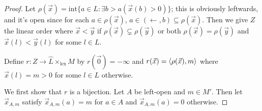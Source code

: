 \documentclass[11pt]{article}
\renewcommand{\int}{\textrm{int}}
\newcommand{\lexTimes}{\times_{\textrm{lex}}}
\newcommand{\vect}{\vec}
\begin{document}
  \begin{proof}
    Let \(\rho(\vect x)=\int\{a\in L:\exists b> a(\vect x(b)>0)\}\);
    this is obviously leftwards, and it's open since for each
    \(a\in\rho(\vect x)\), \(a\in(\leftarrow,b)\subseteq\rho(\vect x)\).
    Then we give \(Z\) the linear order where \(\vect x<\vect y\) if
    \(\rho(\vect x)\subsetneq\rho(\vect y)\) or both
    \(\rho(\vect x)=\rho(\vect y)\)
    and \(\vect x(l)<\vect y(l)\) for some \(l\in L\).

    Define \(r:Z\to \hat L\lexTimes M\)
    by \(r(\vect 0)=-\infty\) and \(r(\vect x)=\<\rho(\vect x),m\>\) where
    \(\vect x(l)=m>0\) for some \(l\in L\) otherwise.

    We first show that \(r\) is a bijection. Let \(A\) be left-open
    and \(m\in M'\). Then let \(\vect x_{A,m}\) satisfy \(\vect x_{A,m}(a)=m\)
    for \(a\in A\) and \(\vect x_{A,m}(a)=0\) otherwise.
  \end{proof}

\newpage


\end{document}
